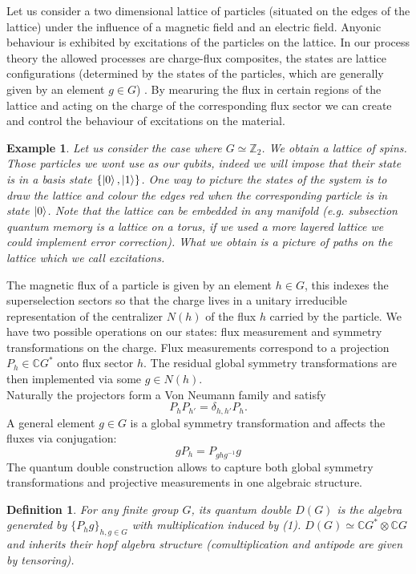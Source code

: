 \documentclass{article}
\newtheorem{definition}{Definition}
\newtheorem{example}{Example}
\begin{document}
Let us consider a two dimensional lattice of particles (situated on the edges of the lattice) under the influence of a magnetic field and an electric field. Anyonic behaviour is exhibited by excitations of the particles on the lattice. In our process theory the allowed processes are charge-flux composites, the states are lattice configurations (determined by the states of the particles, which are generally given by an element $g \in G$)  . By mearuring the flux in certain regions of the lattice and acting on the charge of the corresponding flux sector we can create and control the behaviour of excitations on the material.
\begin{example}
	Let us consider the case where $G \simeq \mathbb{Z}_2$. We obtain a lattice of spins. Those particles we wont use as our qubits, indeed we will impose that their state is in a basis state $\{\ket{0},\ket{1}\}$. One way to picture the states of the system is to draw the lattice and colour the edges red when the corresponding particle is in state $\ket{0}$. Note that the lattice can be embedded in any manifold (e.g. subsection quantum memory is a lattice on a torus, if we used a more layered lattice we could implement error correction). What we obtain is a picture of paths on the lattice which we call excitations.
\end{example}
The magnetic flux of a particle is given by an element $h \in G$, this indexes the superselection sectors so that the charge lives in a unitary irreducible representation of the centralizer $N(h)$ of the flux $h$ carried by the particle. We have two possible operations on our states: flux measurement and symmetry transformations on the charge. Flux measurements correspond to a projection $P_h \in \mathbb{C}G^*$ onto flux sector $h$. The residual global symmetry transformations are then implemented via some $g \in N(h)$. \\
Naturally the projectors form a Von Neumann family and satisfy 
$$P_hP_{h'}= \delta_{h,h'} P_h.$$ 
A general element $g \in G$ is a global symmetry transformation and affects the fluxes via conjugation:
\begin{equation}
gP_h = P_{ghg^{-1}}g
\end{equation}
The quantum double construction allows to capture both global symmetry transformations and projective measurements in one algebraic structure.
\begin{definition}
	For any finite group $G$, its quantum double $D(G)$ is the algebra generated by $\{P_hg\}_{h,g\in G}$ with multiplication induced by (1). $D(G) \simeq \mathbb{C}G^* \otimes \mathbb{C}G$ and inherits their hopf algebra structure (comultiplication and antipode are given by tensoring). 
\end{definition}
\end{document}
